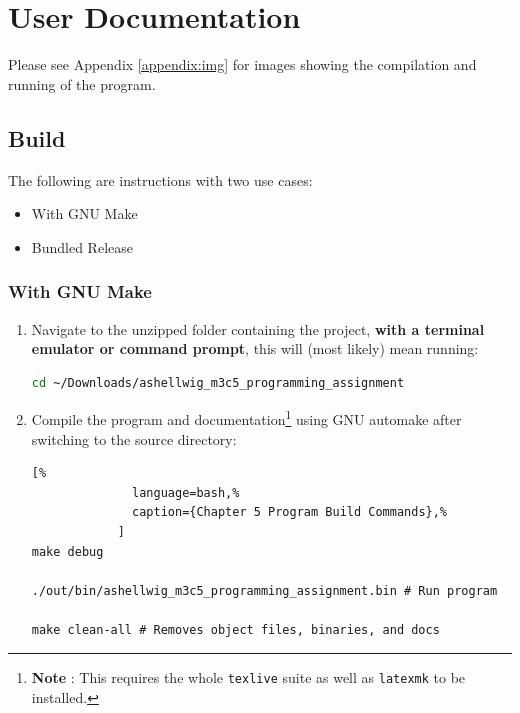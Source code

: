 \documentclass[a4paper, 11pt]{article}
\begin{document}
  \newpage
  \section{User Documentation}
    Please see Appendix \ref{appendix:img} for images showing the compilation
      and running of the program.

    \subsection{Build}
      The following are instructions with two use cases:
      \begin{itemize}
        \item With GNU Make
        \item Bundled Release
      \end{itemize}
      \subsubsection{With GNU Make}
        \begin{enumerate}
          \item Navigate to the unzipped folder containing the project,
            \textbf{with a terminal emulator or command prompt}, this will
            (most likely) mean running:
            \begin{lstlisting}[language=bash]
cd ~/Downloads/ashellwig_m3c5_programming_assignment
            \end{lstlisting}
          \item Compile the program and documentation\footnote{\textbf{Note%
            }: This requires the whole \texttt{texlive} suite as well as
            \texttt{latexmk} to be installed.} using GNU automake after
            switching to the source directory:
            \begin{lstlisting}[%
              language=bash,%
              caption={Chapter 5 Program Build Commands},%
            ]
make debug

./out/bin/ashellwig_m3c5_programming_assignment.bin # Run program

make clean-all # Removes object files, binaries, and docs
            \end{lstlisting}
          \end{enumerate}
\end{document}

